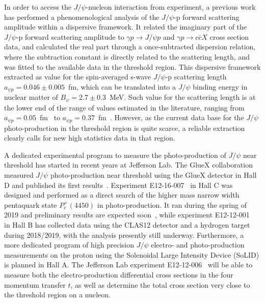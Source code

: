 \documentclass[prd,amsmath,%
twocolumn,floatfix,amssymb, preprintnumbers, linenumbers,nofootinbib, superscriptaddress]{revtex4}
\begin{document}
In order to access the $J/\psi$-nucleon interaction from experiment, a previous work~\cite{Gryniuk:2016mpk} has performed a phenomenological analysis of the $J/\psi$-p forward scattering amplitude within a dispersive framework.  It related the imaginary part of the $J/\psi$-p forward scattering amplitude 
to $\gamma p \to J/\psi p$ and $\gamma p \to c \bar c X$ cross section data, and calculated the real part through a once-subtracted dispersion relation, where the subtraction constant is directly related to the scattering length, and was fitted to the available data in the threshold region.   
This dispersive framework extracted as value for the spin-averaged s-wave $J/\psi$-p scattering length $a_{\psi p} = 0.046 \pm 0.005$~fm, which can be translated into a 
$J/\psi$ binding energy in nuclear matter 
of $B_{\psi} = 2.7 \pm 0.3$~MeV. Such value for the scattering length is at the lower end of the range of values estimated in the literature, ranging from 
$a_{\psi p} = 0.05$~fm~\cite{Kaidalov:1992hd} to 
$a_{\psi p} = 0.37$~fm~\cite{Sibirtsev:2005ex}. However, as the current data base for the $J/\psi$ photo-production in the threshold region is quite scarce, a reliable extraction clearly calls for new high statistics data in that region.  

A dedicated experimental program to measure the  photo-production of $J/\psi$ near threshold  has started in recent years at Jefferson Lab. The GlueX collaboration measured $J/\psi$ photo-production near threshold using the GlueX detector in Hall D and published its first  results~\cite{Ali:2019lzf}. Experiment E12-16-007~\cite{Meziani:2016lhg} in Hall C was designed and performed as a direct search of the higher mass narrow width pentaquark state $P_c^+(4450)$ in photo-production. It ran during the spring of 2019 and preliminary results are expected soon~\cite{Joosten:2020}, while experiment E12-12-001~\cite{CLAS12-tcs:proposal} in Hall B has collected data using the CLAS12 detector and a hydrogen target during  2018/2019, with the analysis presently still underway. Furthermore, a more dedicated program of high precision $J/\psi$ electro- and photo-production  measurements on the proton  using the Solenoidal Large Intensity Device (SoLID) is planned in Hall A. The Jefferson Lab experiment E12-12-006~\cite{SoLIDjpsi:proposal} will be able to measure both the electro-production differential cross sections in the four momentum transfer $t$, as well as determine the total cross section very close to the threshold region on a nucleon.  
\end{document}
